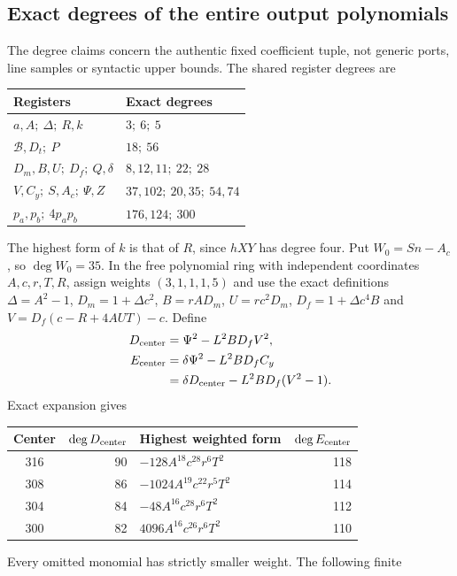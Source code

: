 \subsection{Exact degrees of the entire output polynomials}
The degree claims concern the authentic fixed coefficient tuple, not
generic ports, line samples or syntactic upper bounds. The shared register
degrees are
\begin{center}\small
\begin{tabular}{@{}ll@{}}\toprule
Registers & Exact degrees\\\midrule
$a,A;\ \Delta;\ R,k$ & $3;\ 6;\ 5$\\
$\mathcal B,D_t;\ P$ & $18;\ 56$\\
$D_m,B,U;\ D_f;\ Q,\delta$ & $8,12,11;\ 22;\ 28$\\
$V,C_y;\ S,A_c;\ \Psi,Z$ & $37,102;\ 20,35;\ 54,74$\\
$p_a,p_b;\ 4p_ap_b$ & $176,124;\ 300$\\\bottomrule
\end{tabular}
\end{center}
The highest form of $k$ is that of $R$, since $hXY$ has degree four.
Put $W_0=Sn-A_c$, so $\deg W_0=35$. In the free polynomial ring
with independent coordinates $A,c,r,T,R$, assign weights $(3,1,1,1,5)$
and use the exact definitions $\Delta=A^2-1$, $D_m=1+\Delta c^2$,
$B=rAD_m$, $U=rc^2D_m$, $D_f=1+\Delta c^4B$ and
$V=D_f(c-R+4AUT)-c$. Define
\begin{align}
 D_{\rm center}&=\Psi^2-L^2BD_fV^2,\nonumber\\
 E_{\rm center}&=\delta\Psi^2-L^2BD_fC_y\nonumber\\
 &=\delta D_{\rm center}-L^2BD_f(V^2-1).
 \label{eq:centeridentity}
\end{align}
Exact expansion gives
\begin{center}\small
\begin{tabular}{@{}crlr@{}}\toprule
Center & $\deg D_{\rm center}$ & Highest weighted form & $\deg E_{\rm center}$\\\midrule
316&90&$-128A^{18}c^{28}r^6T^2$&118\\
308&86&$-1024A^{19}c^{22}r^5T^2$&114\\
304&84&$-48A^{16}c^{28}r^6T^2$&112\\
300&82&$4096A^{16}c^{26}r^6T^2$&110\\\bottomrule
\end{tabular}
\end{center}
Every omitted monomial has strictly smaller weight. The following finite

